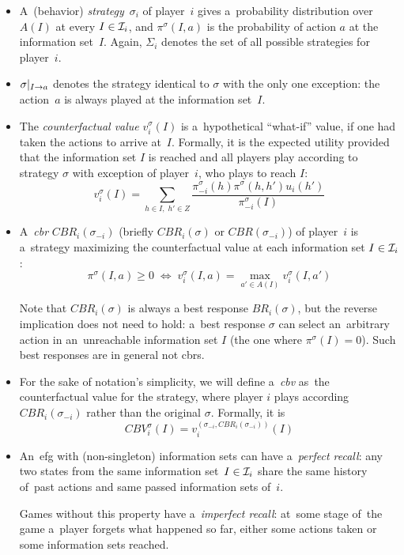 \begin{itemize}
  \item A~(behavior) \emph{strategy}~$\sigma_i$ of player~$i$ gives a~probability distribution over $A(I)$ at every $I \in \mathcal{I}_i$, and $\pi ^\sigma (I, a)$ is the probability of action $a$ at the information set~$I$.
    Again, $\Sigma_i$ denotes the set of all possible strategies for player~$i$.

  \item $\sigma | _{I \rightarrow a}$ denotes the strategy identical to $\sigma$ with the only one exception:
    the action~$a$ is always played at the information set~$I$.

  \item The \emph{counterfactual value} $v _i ^\sigma (I)$ is a~hypothetical ``what-if'' value, if one had taken the actions to arrive at~$I$.
    Formally, it is the expected utility provided that the information set $I$ is reached and all players play according to strategy $\sigma$ with exception of player~$i$, who plays to reach $I$:
    \[ v _i ^\sigma (I) = \sum\limits _{h \in I, \; h' \in Z}
      \frac
      {\pi _{-i} ^\sigma(h) \pi ^\sigma(h,h') u_i(h')}
      {\pi _{-i} ^\sigma (I)} \]

  \item A~\emph{\acrlong{cbr}} $CBR _i (\sigma _{-i})$ (briefly $CBR _i (\sigma)$ or $CBR(\sigma_{-i})$) of player~$i$ is a~strategy maximizing the counterfactual value at each information set $I \in \mathcal{I} _i$:
    \[ \pi ^\sigma (I, a) \geq 0
      \; \Longleftrightarrow \;
      v _i ^\sigma (I, a) = \max _{a' \in A(I)} v _i ^\sigma (I, a') \]

    Note that $CBR _i (\sigma)$ is always a best response $BR _i (\sigma)$, but the reverse implication does not need to hold:
    a~best response $\sigma$ can select an~arbitrary action in an~unreachable information set $I$ (the one where $\pi ^\sigma (I) = 0$).
    Such best responses are in general not \acrlong{cbr}s.

  \item For the sake of notation's simplicity, we will define a~\emph{\acrfull{cbv}} as~the counterfactual value for the strategy, where player $i$ plays according $CBR _i (\sigma _{-i})$ rather than the original $\sigma$.
    Formally, it is
    \[ CBV _i ^\sigma (I) = v _i ^{(\sigma _{-i}, CBR _i (\sigma _{-i} ))} (I) \]

  \item An~\acrshort{efg} with (non-singleton) information sets can have a~\emph{perfect recall}:
    any two states from the same information set~$I \in \mathcal{I} _i$ share the same history of~past actions and same passed information sets of~$i$.

    Games without this property have a~\emph{imperfect recall}:
    at~some stage of~the game a~player forgets what happened so far, either some actions taken or some information sets reached.
\end{itemize}

